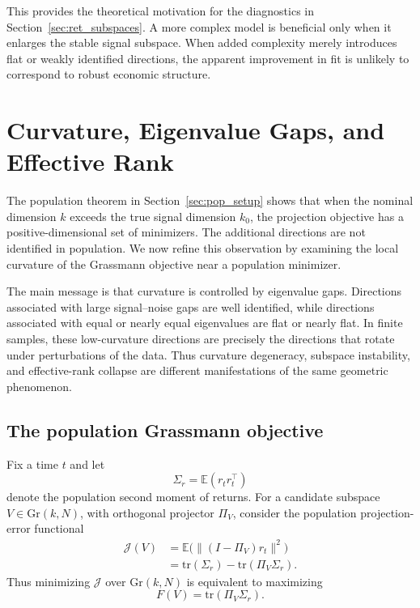 \documentclass[11pt,letterpaper]{article}
\newcommand{\gr}{\mathrm{Gr}}
\newcommand{\tr}{\mathrm{tr}}
\newcommand{\cJ}{\mathcal{J}}
\begin{document}
This provides the theoretical motivation for the diagnostics in Section~\ref{sec:ret_subspaces}. A more complex model is beneficial only when it enlarges the stable signal subspace. When added complexity merely introduces flat or weakly identified directions, the apparent improvement in fit is unlikely to correspond to robust economic structure.

\section{Curvature, Eigenvalue Gaps, and Effective Rank}
\label{sec:curvature}

The population theorem in Section~\ref{sec:pop_setup} shows that when the nominal dimension $k$ exceeds the true signal dimension $k_0$, the projection objective has a positive-dimensional set of minimizers. The additional directions are not identified in population. We now refine this observation by examining the local curvature of the Grassmann objective near a population minimizer.

The main message is that curvature is controlled by eigenvalue gaps. Directions associated with large signal--noise gaps are well identified, while directions associated with equal or nearly equal eigenvalues are flat or nearly flat. In finite samples, these low-curvature directions are precisely the directions that rotate under perturbations of the data. Thus curvature degeneracy, subspace instability, and effective-rank collapse are different manifestations of the same geometric phenomenon.

\subsection{The population Grassmann objective}
\label{subsec:population-grassmann-objective}

Fix a time $t$ and let
\begin{equation}
\label{eq:Sigma-r}
\Sigma_r = \mathbb{E}(r_t r_t^\top)
\end{equation}
denote the population second moment of returns. For a candidate subspace $V\in\gr(k,N)$, with orthogonal projector $\Pi_V$, consider the population projection-error functional
\begin{equation}
\label{eq:pop-grass-functional}
\begin{split}
\cJ(V)
&=
\mathbb{E}\big(\|(I-\Pi_V)r_t\|^2\big)\\
&=\tr(\Sigma_r)-\tr(\Pi_V\Sigma_r).
\end{split}
\end{equation}
Thus minimizing $\cJ$ over $\gr(k,N)$ is equivalent to maximizing
\begin{equation}
\label{eq:grassmann-rayleigh-functional}
F(V)=\tr(\Pi_V\Sigma_r).
\end{equation}
\end{document}
